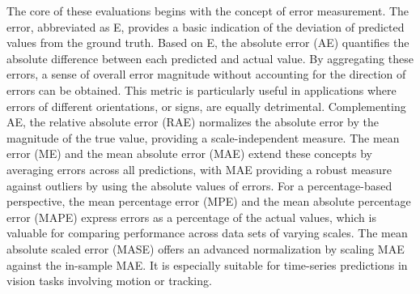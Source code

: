 \documentclass{article}
\begin{document}
The core of these evaluations begins with the concept of error measurement. The error, abbreviated as E, provides a basic indication of the deviation of predicted values from the ground truth. Based on E, the absolute error (AE) \cite{richardson2004h} quantifies the absolute difference between each predicted and actual value. By aggregating these errors, a sense of overall error magnitude without accounting for the direction of errors can be obtained. This metric is particularly useful in applications where errors of different orientations, or signs, are equally detrimental. Complementing AE, the relative absolute error (RAE) \cite{armstrong1992error, armstrong2000another, rodrigues2017machine} normalizes the absolute error by the magnitude of the true value, providing a scale-independent measure. The mean error (ME) \cite{fisher1920012, anjali2019temperature} and the mean absolute error (MAE) \cite{willmott2005advantages, hyndman2006another} extend these concepts by averaging errors across all predictions, with MAE providing a robust measure against outliers by using the absolute values of errors. For a percentage-based perspective, the mean percentage error (MPE) \cite{pearson1895x, jiang2008prediction} and the mean absolute percentage error (MAPE) \cite{armstrong1992error, hyndman2006another} express errors as a percentage of the actual values, which is valuable for comparing performance across data sets of varying scales. The mean absolute scaled error (MASE) \cite{hyndman2006another, mohan2018deep} offers an advanced normalization by scaling MAE against the in-sample MAE. It is especially suitable for time-series predictions in vision tasks involving motion or tracking.
\end{document}
